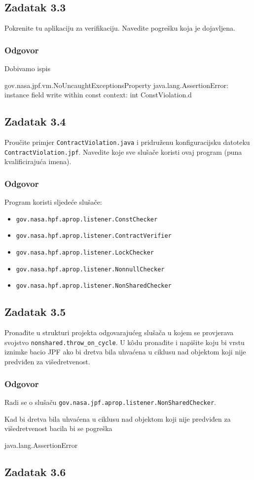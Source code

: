 \documentclass{article}
\newcommand{\zadatak}[1]{\subsection{Zadatak #1}}
\newcommand{\odgovor}{\subsubsection*{Odgovor}}
\begin{document}
\zadatak{3.3}

Pokrenite tu aplikaciju za verifikaciju. Navedite pogrešku koja je dojavljena.

\odgovor

Dobivamo ispis 

\begin{ccode}
gov.nasa.jpf.vm.NoUncaughtExceptionsProperty
java.lang.AssertionError: instance field write within const context: int ConstViolation.d
\end{ccode}

\zadatak{3.4}

Proučite primjer \texttt{ContractViolation.java} i pridruženu konfiguracijsku datoteku \texttt{ContractViolation.jpf}. Navedite koje sve slušače koristi ovaj program (puna kvalificirajuća imena).

\odgovor

Program koristi sljedeće slušače:

\begin{itemize}
    \item \texttt{gov.nasa.hpf.aprop.listener.ConstChecker}
    \item \texttt{gov.nasa.hpf.aprop.listener.ContractVerifier}
    \item \texttt{gov.nasa.hpf.aprop.listener.LockChecker}
    \item \texttt{gov.nasa.hpf.aprop.listener.NonnullChecker}
    \item \texttt{gov.nasa.hpf.aprop.listener.NonSharedChecker}
\end{itemize}

\zadatak{3.5}

Pronađite u strukturi projekta odgovarajućeg slušača u kojem se provjerava svojstvo \texttt{nonshared.throw\_on\_cycle}. U kôdu pronađite i napišite koju bi vrstu iznimke bacio JPF ako bi dretva bila uhvaćena u ciklusu nad objektom koji nije predviđen za višedretvenost.

\odgovor

Radi se o slušaču \texttt{gov.nasa.jpf.aprop.listener.NonSharedChecker}.\newline

\noindent
Kad bi dretva bila uhvaćena u ciklusu nad objektom koji nije predviđen za višedretvenost bacila bi se pogreška

\begin{ccode}
java.lang.AssertionError
\end{ccode}

\zadatak{3.6}
\end{document}
